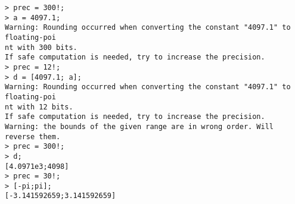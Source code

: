 \begin{center}\begin{minipage}{15cm}\begin{Verbatim}[frame=single]
> prec = 300!;
> a = 4097.1;
Warning: Rounding occurred when converting the constant "4097.1" to floating-poi
nt with 300 bits.
If safe computation is needed, try to increase the precision.
> prec = 12!;
> d = [4097.1; a];
Warning: Rounding occurred when converting the constant "4097.1" to floating-poi
nt with 12 bits.
If safe computation is needed, try to increase the precision.
Warning: the bounds of the given range are in wrong order. Will reverse them.
> prec = 300!;
> d;
[4.0971e3;4098]
> prec = 30!;
> [-pi;pi];
[-3.141592659;3.141592659]
\end{Verbatim}
\end{minipage}\end{center}
